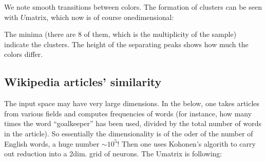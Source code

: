 \documentclass[letterpaper,10pt,english]{jupyterBook}
\begin{document}
\noindent{}

\sphinxAtStartPar
We note smooth transitions between colors. The formation of clusters can be seen with \(U\)\sphinxhyphen{}matrix, which now is of course one\sphinxhyphen{}dimensional:

\begin{sphinxVerbatim}[commandchars=\\\{\}]

   
    \PYG{p}{[}\PYG{p}{]}\PYG{p}{[}\PYG{p}{]}\PYG{p}{[}\PYG{p}{]}\PYG{p}{[}\PYG{p}{]}\PYG{p}{[}\PYG{p}{]}
\end{sphinxVerbatim}

\noindent{}

\sphinxAtStartPar
The minima (there are 8 of them, which is the multiplicity of the sample) indicate the clusters. The height of the separating peaks shows how much the colors differ.


\subsection{Wikipedia articles’ similarity}
\label{\detokenize{docs/som:wikipedia-articles-similarity}}
\sphinxAtStartPar
The input space may have very large dimensions. In the  below, one takes articles from various fields and computes frequencies of words (for instance, how  many times the word “goalkeeper” has been used, divided by the total number of words in the article). So essentially the dimensionality is of the oder of the number of English words, a huge number \(\sim 10^5\)! Then one uses Kohonen’s algorith to carry out reduction into a 2\sphinxhyphen{}dim. grid of neurons. The U\sphinxhyphen{}matrix is following:

\noindent{}
\end{document}

